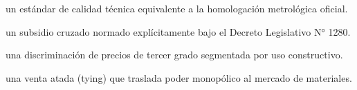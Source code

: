\begin{opts}
    \item un estándar de calidad técnica equivalente a la homologación metrológica oficial.
    \item un subsidio cruzado normado explícitamente bajo el Decreto Legislativo N° 1280.
    \item una discriminación de precios de tercer grado segmentada por uso constructivo.
    \item una venta atada (tying) que traslada poder monopólico al mercado de materiales.
\end{opts}


